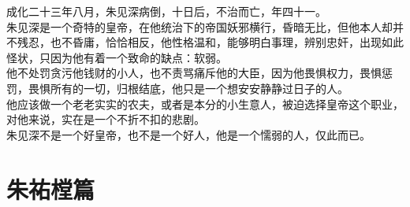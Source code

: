 \begin{multicols}{\theparacolNo}
成化二十三年八月，朱见深病倒，十日后，不治而亡，年四十一。\\

朱见深是一个奇特的皇帝，在他统治下的帝国妖邪横行，昏暗无比，但他本人却并不残忍，也不昏庸，恰恰相反，他性格温和，能够明白事理，辨别忠奸，出现如此怪状，只因为他有着一个致命的缺点：软弱。\\

他不处罚贪污他钱财的小人，也不责骂痛斥他的大臣，因为他畏惧权力，畏惧惩罚，畏惧所有的一切，归根结底，他只是一个想安安静静过日子的人。\\

他应该做一个老老实实的农夫，或者是本分的小生意人，被迫选择皇帝这个职业，对他来说，实在是一个不折不扣的悲剧。\\

朱见深不是一个好皇帝，也不是一个好人，他是一个懦弱的人，仅此而已。\\
\ifnum{}
	\end{multicols}
\fi
\newpage
\chapter*{朱祐樘篇}
